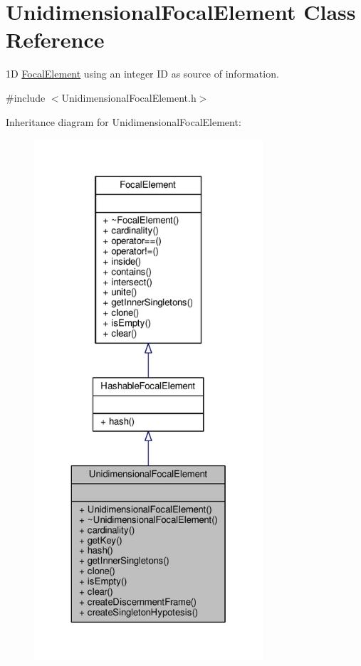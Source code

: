 \hypertarget{classUnidimensionalFocalElement}{}\section{Unidimensional\+Focal\+Element Class Reference}
\label{classUnidimensionalFocalElement}


1D \hyperlink{classFocalElement}{Focal\+Element} using an integer ID as source of information.  




{\ttfamily \#include $<$Unidimensional\+Focal\+Element.\+h$>$}



Inheritance diagram for Unidimensional\+Focal\+Element\+:\nopagebreak
\begin{figure}[H]
\begin{center}
\leavevmode
\includegraphics[height=550pt]{classUnidimensionalFocalElement__inherit__graph}
\end{center}
\end{figure}


